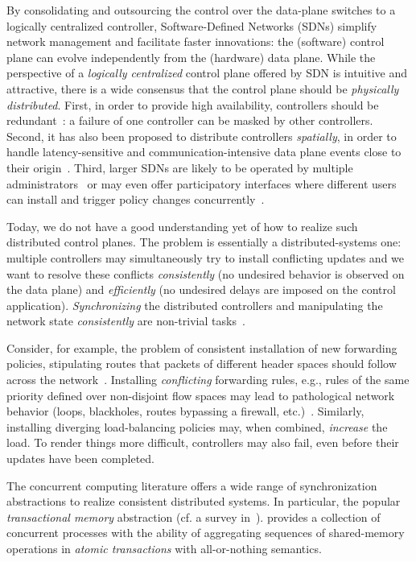 \documentclass{sig-alternate-2006}
\begin{document}
By consolidating and outsourcing the control over the data-plane switches to a logically
centralized controller, Software-Defined Networks (SDNs)
simplify network management and facilitate faster innovations:
the (software) control plane can evolve independently from the
(hardware) data plane.
While the perspective of a \emph{logically centralized} control plane
offered by SDN is intuitive and attractive,
there is a wide consensus that
the control plane should be  \emph{physically distributed}.
First, in order to provide high availability,
controllers should be redundant~\cite{onix,onos,elasticon}: a failure
of one controller can be masked by other controllers.
Second, it has also been proposed to distribute controllers \emph{spatially}, in order to handle latency-sensitive and
communication-intensive
data plane
events close to their origin~\cite{devoflow,kandoo}.
Third, larger SDNs are likely to be operated by multiple administrators~\cite{stn} or may even offer
participatory interfaces where different users can install and trigger policy changes
concurrently~\cite{participatory}.

Today, we do not have a good understanding yet of how to realize
such distributed control planes. The problem is essentially a
distributed-systems
one: multiple controllers may simultaneously try to
install conflicting updates and we want to resolve these conflicts
\emph{consistently} (no undesired behavior is observed on the data
plane) and \emph{efficiently} (no undesired delays are imposed on the
control application).
\emph{Synchronizing}
the distributed controllers and manipulating the network state \emph{consistently}
are non-trivial tasks~\cite{sharon}.

Consider, for example, the problem of
consistent installation of new forwarding policies, stipulating routes
that packets of different header spaces should follow across the
network~\cite{network-update,roger-hotnets,podc15}.
Installing \emph{conflicting} forwarding rules, e.g., rules of the same priority defined over non-disjoint
flow spaces may lead to pathological network behavior (loops,
blackholes, routes bypassing a firewall, etc.)~\cite{hotnets14update,roger-hotnets}.
Similarly, installing diverging load-balancing policies may,
when combined, \emph{increase} the load.
To render things more difficult, controllers may also fail,
even before their updates have been completed.

The concurrent computing literature offers
a wide range of synchronization abstractions
to realize consistent distributed systems.
In particular, the popular 
\emph{transactional  memory} abstraction (cf. a survey in~\cite{tm-book}). 
provides a
collection of
concurrent processes with the ability of aggregating sequences of
shared-memory operations in \emph{atomic  transactions} with
all-or-nothing semantics.
\end{document}
